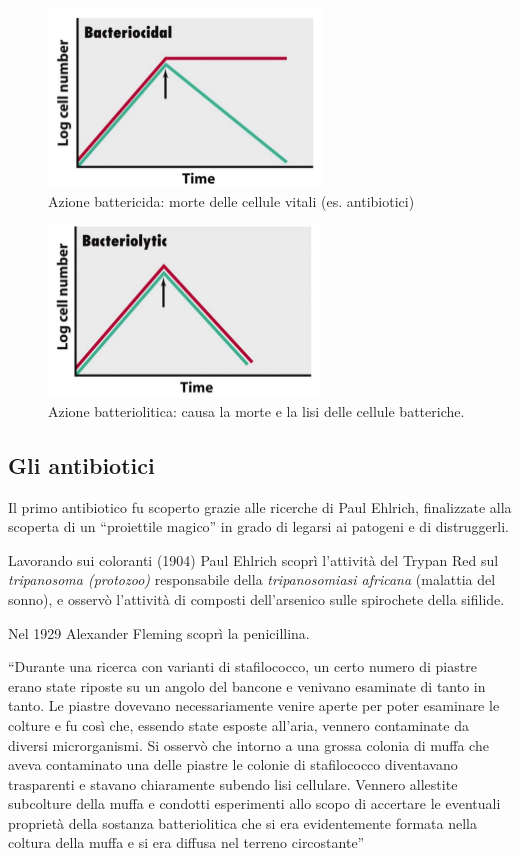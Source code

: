 \documentclass[11pt]{book}
\begin{document}
\begin{figure}[htp]
\centering
\includegraphics[scale=0.6]{img/Bacteriocidal.png}
\caption{Azione battericida: morte delle cellule vitali (es. antibiotici)}
\label{}
\end{figure}

\begin{figure}[htp]
\centering
\includegraphics[scale=0.6]{img/Bacteriolytic.png}
\caption{Azione batteriolitica: causa la morte e la lisi delle cellule batteriche.}
\label{}
\end{figure}



\subsection{Gli antibiotici}
Il primo antibiotico fu scoperto grazie alle ricerche di Paul Ehlrich, finalizzate alla scoperta di un ``proiettile magico'' in grado di legarsi ai patogeni e di distruggerli. 

Lavorando sui coloranti (1904) Paul Ehlrich scoprì l’attività del Trypan Red sul\emph{ tripanosoma (protozoo)} responsabile della \emph{tripanosomiasi africana} (malattia del sonno), e osservò l’attività di composti dell’arsenico sulle spirochete della sifilide.

\vspace{1em}
Nel 1929 Alexander Fleming scoprì la penicillina. 

``Durante una ricerca con varianti di stafilococco, un certo numero di piastre erano state riposte su un angolo del bancone e venivano esaminate di tanto in tanto. Le piastre dovevano necessariamente venire aperte per poter esaminare le colture e fu così che, essendo state esposte all'aria, vennero contaminate da diversi microrganismi. Si osservò che intorno a una grossa colonia di muffa che aveva contaminato una delle piastre le colonie di stafilococco diventavano trasparenti e stavano chiaramente subendo lisi cellulare. Vennero allestite subcolture della muffa e condotti esperimenti allo scopo di accertare le eventuali proprietà della sostanza batteriolitica che si era evidentemente formata nella coltura della muffa e si era diffusa nel terreno circostante''
\end{document}

